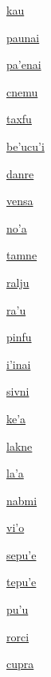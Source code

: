 {\hyperlink{val:kau}{kau}}{}{}{}

{\hyperlink{val:paunai}{paunai}}{}{}{}

{\hyperlink{val:pahenai}{pa'enai}}{}{}{}

{\hyperlink{val:cnemu}{cnemu}}{}{}{}

{\hyperlink{val:taxfu}{taxfu}}{}{}{}

{\hyperlink{val:behucuhi}{be'ucu'i}}{}{}{}

{\hyperlink{val:danre}{danre}}{}{}{}

{\hyperlink{val:vensa}{vensa}}{}{}{}

{\hyperlink{val:noha}{no'a}}{}{}{}

{\hyperlink{val:tamne}{tamne}}{}{}{}

{\hyperlink{val:ralju}{ralju}}{}{}{}

{\hyperlink{val:rahu}{ra'u}}{}{}{}

{\hyperlink{val:pinfu}{pinfu}}{}{}{}

{\hyperlink{val:ihinai}{i'inai}}{}{}{}

{\hyperlink{val:sivni}{sivni}}{}{}{}

{\hyperlink{val:keha}{ke'a}}{}{}{}

{\hyperlink{val:lakne}{lakne}}{}{}{}

{\hyperlink{val:laha}{la'a}}{}{}{}

{\hyperlink{val:nabmi}{nabmi}}{}{}{}

{\hyperlink{val:viho}{vi'o}}{}{}{}

{\hyperlink{val:sepuhe}{sepu'e}}{}{}{}

{\hyperlink{val:tepuhe}{tepu'e}}{}{}{}

{\hyperlink{val:puhu}{pu'u}}{}{}{}

{\hyperlink{val:rorci}{rorci}}{}{}{}

{\hyperlink{val:cupra}{cupra}}{}{}{}

